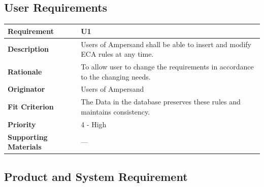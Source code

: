 \documentclass[12pt]{report}
\begin{document}


\subsection{User Requirements}

{\setlength{\tabcolsep}{12pt} %
\begin{tabularx}{\textwidth}{>{\bfseries}C{3cm}X}
Requirement & U1 \\ 
\midrule
\endhead
Description  & Users of Ampersand shall be able to insert and 
modify ECA rules at any time.  
\\	Rationale & To allow user to change the requirements in accordance to the changing needs.
\\	Originator & Users of Ampersand
\\	Fit Criterion & The Data in the database preserves these rules and maintains consistency.   
\\	Priority & 4 - High
\\	Supporting Materials & --- 
\vspace{12pt}
\end{tabularx}
}

\subsection{Product and System Requirement}
\end{document}

